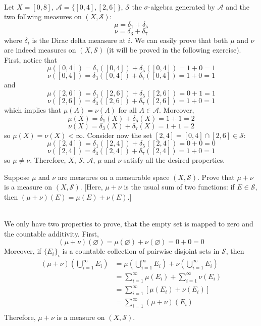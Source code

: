 \begin{solution}
    \\ Let $X = [0, 8]$, $\mathcal{A} = \{[0, 4], [2, 6]\}$, $\mathcal{S}$ the $\sigma$-algebra generated by $\mathcal{A}$ and the two follwing measures on $(X, \mathcal{S})$:
    $$\mu = \delta_1 + \delta_5$$
    $$\nu = \delta_3 + \delta_7$$
    where $\delta_i$ is the Dirac delta meaasure at $i$. We can easily prove that both $\mu$ and $\nu$ are indeed measures on $(X, \mathcal{S})$ (it will be proved in the following exercise). First, notice that
    $$\mu([0, 4]) = \delta_1([0,4]) + \delta_5([0,4]) = 1 + 0 = 1$$
    $$\nu([0, 4]) = \delta_3([0,4]) + \delta_7([0,4]) = 1 + 0 = 1$$
    and 
    $$\mu([2, 6]) = \delta_1([2, 6]) + \delta_5([2,6]) = 0 + 1 = 1$$
    $$\nu([2, 6]) = \delta_3([2,6]) + \delta_7([2,6]) = 1 + 0 = 1$$
    which implies that $\mu(A) = \nu(A)$ for all $A \in \mathcal{A}$. Moreover, 
    $$\mu(X) = \delta_1(X) + \delta_5(X) = 1 + 1 = 2$$
    $$\nu(X) = \delta_3(X) + \delta_7(X) = 1 + 1 = 2$$
    so $\mu(X) = \nu(X) < \infty$. Consider now the set $[2, 4] = [0, 4] \cap [2 ,6] \in \mathcal{S}$:
    $$\mu([2, 4]) = \delta_1([2, 4]) + \delta_5([2,4]) = 0 + 0 = 0$$
    $$\nu([2, 4]) = \delta_3([2,4]) + \delta_7([2,4]) = 1 + 0 = 1$$
    so $\mu \neq \nu$. Therefore, $X$, $\mathcal{S}$, $\mathcal{A}$, $\mu$ and $\nu$ satisfy all the desired properties. \\
\end{solution}

\begin{exercise}
    Suppose $\mu$ and $\nu$ are measures on a measurable space $(X, \mathcal{S})$. Prove that $\mu + \nu$ is a measure on $(X, \mathcal{S})$. $[$Here, $\mu + \nu$ is the usual sum of two functions: if $E \in \mathcal{S}$, then $(\mu + \nu)(E) = \mu(E) + \nu(E)$.$]$ \\
\end{exercise}

\begin{solution}
    \\ We only have two properties to prove, that the empty set is mapped to zero and the countable additivity. First,
    $$(\mu + \nu)(\varnothing) = \mu(\varnothing) + \nu(\varnothing) = 0 + 0 = 0$$
    Moreover, if $\{E_i\}_i$ is a countable collection of pairwise disjoint sets in $\mathcal{S}$, then
    \begin{align*}
        (\mu + \nu)\left(\bigcup_{i=1}^{\infty}E_i\right) &= \mu\left(\bigcup_{i=1}^{\infty}E_i\right) + \nu\left(\bigcup_{i=1}^{\infty}E_i\right) \\
        &= \sum_{i=1}^{\infty}\mu(E_i) + \sum_{i=1}^{\infty}\nu(E_i) \\
        &= \sum_{i=1}^{\infty}[\mu(E_i) + \nu(E_i)] \\
        &= \sum_{i=1}^{\infty}(\mu + \nu)(E_i) \\
    \end{align*}
    Therefore, $\mu + \nu$ is a measure on $(X, \mathcal{S})$.\\ 
\end{solution}

